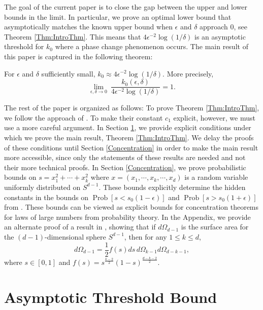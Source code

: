 \documentclass[twoside,11pt]{article}
\newcommand{\pP}[1]{\operatorname{Prob}\left[ #1 \right] }
\begin{document}
The goal of the current  paper is to close the gap between the upper and lower bounds in the limit.  In particular, we prove an optimal lower bound that  asymptotically matches the known upper bound when $\epsilon$ and $\delta$ approach $0$, see 
Theorem \ref{Thm:IntroThm}.   This means that $4 \epsilon^{-2} \log(1/\delta)$ is an asymptotic threshold for $k_0$ where  a phase change phenomenon occurs.  The main result of this paper is captured in the following theorem:
\begin{theorem} \label{Thm:IntroThm}
For $\epsilon$ and $\delta$ sufficiently small, $k_0 \approx 4\epsilon^{-2} \log(1/\delta)$.  More precisely,
\[ \lim_{\epsilon, \delta \rightarrow 0} \  \frac{k_0(\epsilon, \delta)}{4\epsilon^{-2} \log(1/\delta)} =  1.\]
\end{theorem}				

The rest of the paper is organized as follows: To prove Theorem \ref{Thm:IntroThm}, we follow the approach of  \cite{KaneNelsonMeka}.  To make their constant $c_1$ explicit, however,  we  must use a more careful argument.  
In Section \ref{Sec:Main:New}, we provide explicit conditions under which we prove the main result, Theorem \ref{Thm:IntroThm}.  
We delay the proofs of these conditions until Section \ref{Concentration} in order to make the main result more accessible, since only the statements of these results are needed and not their more technical proofs.  In Section \ref{Concentration}, we prove probabilistic bounds  on $s =x_1^2 + \cdots + x_k^2$ where
 $x=(x_1, \cdots, x_k, \cdots, x_d)$ is a random variable uniformly distributed on $S^{d-1}$.  These bounds explicitly determine the hidden constants in the bounds on $\pP{s<s_0(1-\epsilon)}$ and $\pP{s>s_0(1+\epsilon)}$ from \cite[Theorem 20]{KaneNelsonMeka}.  These bounds can be viewed as explicit bounds for concentration theorems for laws of large numbers from probability theory.  
In the Appendix, we provide an alternate proof of a result in \cite{KaneNelsonMeka}, showing that if $d\Omega_{d-1}$ is the surface area for the $(d-1)$-dimensional sphere $S^{d-1}$, then for any $1\leq k \leq d$, 
  \[ d\Omega_{d-1} = \frac{1}{2} f(s)ds\, d\Omega_{k-1} d\Omega_{d-k-1},\]
where $s \in [0,1]$ and   $f(s) =  s^{\frac{k-2}{2}}(1-s)^{\frac{d-k-2}{2}}$.  
  
\section{Asymptotic Threshold Bound} \label{Sec:Main:New}
\end{document}
